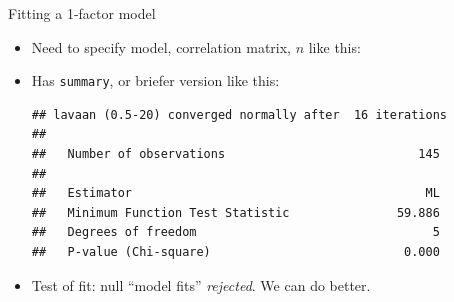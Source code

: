 \begin{frame}[fragile]{Fitting a 1-factor model}
  
  \begin{itemize}
  \item Need to specify model, correlation matrix, $n$ like this:

\begin{knitrout}
\color{fgcolor}\begin{kframe}
\begin{alltt}
\hlkwb{=}
    \hlstd{=}\hlstd{)}
\end{alltt}
\end{kframe}
\end{knitrout}

\item Has \texttt{summary}, or briefer version like this:
  
{\small  

\begin{knitrout}
\color{fgcolor}\begin{kframe}
\begin{alltt}
\end{alltt}
\begin{verbatim}
## lavaan (0.5-20) converged normally after  16 iterations
## 
##   Number of observations                           145
## 
##   Estimator                                         ML
##   Minimum Function Test Statistic               59.886
##   Degrees of freedom                                 5
##   P-value (Chi-square)                           0.000
\end{verbatim}
\end{kframe}
\end{knitrout}
}  
 

\item Test of fit: null ``model fits'' \emph{rejected}. We can do better.
  \end{itemize}
  
\end{frame}

